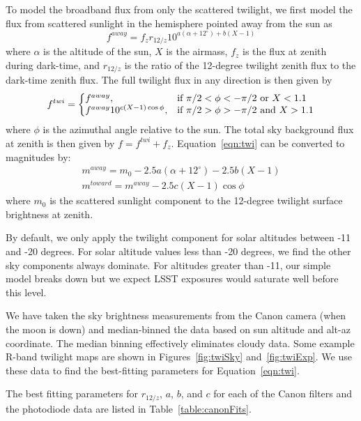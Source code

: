 \documentclass[]{spie}
\begin{document}
To model the broadband flux from only the scattered twilight, we first model the flux from scattered sunlight in the hemisphere pointed away from the sun as
\begin{equation}\label{eqn:twi1}
  f^{away} = f_{z} r_{12/z} 10^{a(\alpha+12^{\circ})+b(X-1)}
\end{equation}
where $\alpha$ is the altitude of the sun, $X$ is the airmass, $f_{z}$ is the flux at zenith during dark-time, and $r_{12/z}$ is the ratio of the 12-degree twilight zenith flux to the dark-time zenith flux. The full twilight flux in any direction is then given by
\begin{equation}
  \label{eqn:twi}
  f^{twi}  = \left\{
  \begin{array}{@{}ll@{}}
        f^{away}, & \text{if}\  \pi/2 < \phi < -\pi/2  \text{ or } X < 1.1\\
        f^{away} 10^{c (X-1) \cos{\phi}}, &  \text{if}\   \pi/2 > \phi >  -\pi/2 \text{ and } X > 1.1
        \end{array} \right.
\end{equation}
where $\phi$ is the azimuthal angle relative to the sun. The total sky background flux at zenith is then given by $f = f^{twi} + f_{z}$. Equation~\ref{eqn:twi} can be converted to magnitudes by:
\begin{eqnarray}
  m^{away} = m_0 -2.5a(\alpha+12^{\circ})-2.5b(X-1) \\
  m^{toward} = m^{away} -2.5c(X-1)\cos{\phi}
\end{eqnarray}
where $m_0$ is the scattered sunlight component to the 12-degree twilight surface brightness at zenith.  

By default, we only apply the twilight component for solar altitudes between -11 and -20 degrees. For solar altitude values less than -20 degrees, we find the other sky components always dominate. For altitudes greater than -11, our simple model breaks down but we expect LSST exposures would saturate well before this level.  

We have taken the sky brightness measurements from the Canon camera (when the moon is down) and median-binned the data based on sun altitude and alt-az coordinate.  The median binning effectively eliminates cloudy data.  Some example R-band twilight maps are shown in Figures~\ref{fig:twiSky} and~\ref{fig:twiExp}.  We use these data to find the best-fitting parameters for Equation~\ref{eqn:twi}.  

The best fitting parameters for $r_{12/z}$, $a$, $b$, and $c$ for each of the Canon filters and the photodiode data are listed in Table~\ref{table:canonFits}.
\end{document}
